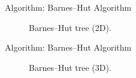 \documentclass[10pt, xcolor = svgnames, aspectratio=43]{beamer} %
\begin{document}
\begin{frame}{Algorithm: Barnes--Hut Algorithm}
\begin{figure}
\caption{Barnes–Hut tree (2D).}
\label{Barnes–Hut-tree2}
\end{figure}
\end{frame}

\begin{frame}{Algorithm: Barnes--Hut Algorithm}
\begin{figure}
\caption{Barnes–Hut tree (3D).\cite{barnes_hierarchical_1986}}
\label{Barnes–Hut-tree3}
\end{figure}
\end{frame}
\end{document}
